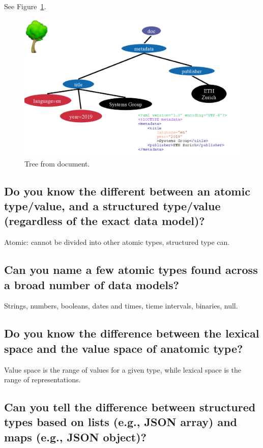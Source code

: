 \documentclass{article}
\begin{document}
See Figure~\ref{fig:treefromdoc}.

\begin{figure}
  \centering
  \includegraphics[width=.8\textwidth]{img/treefromdoc.png}
  \caption{Tree from document.}
  \label{fig:treefromdoc}
\end{figure}

\subsection{Do you know the different between an atomic type/value, and a structured type/value (regardless of the exact data model)?}

Atomic: cannot be divided into other atomic types, structured type can.

\subsection{Can you name a few atomic types found across a broad number of data models?}

Strings, numbers, booleans, dates and times, tieme intervals, binaries, null.

\subsection{Do you know the difference between the lexical space and the value space of anatomic type?}

Value space is the range of values for a given type, while lexical space is the range of representations.

\subsection{Can you tell the difference between structured types based on lists (e.g., JSON array) and maps (e.g., JSON object)?}
\end{document}
